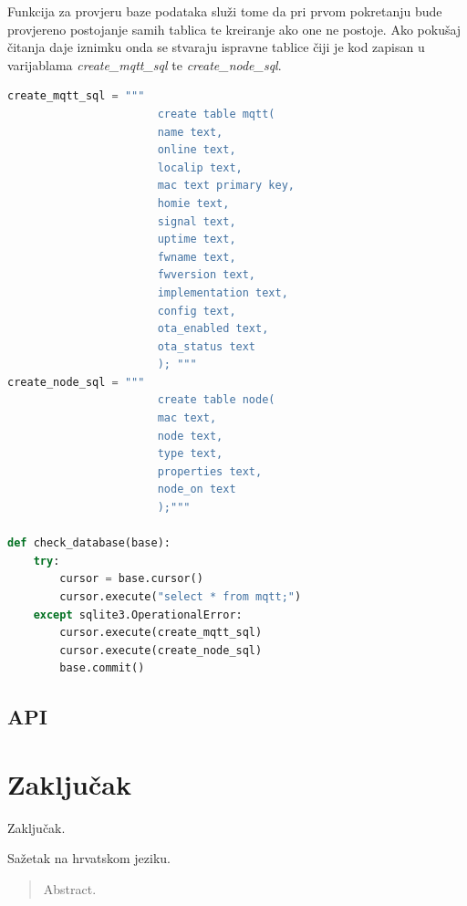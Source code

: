 \documentclass[times, utf8, zavrsni]{fer}
\begin{document}
Funkcija za provjeru baze podataka služi tome da pri prvom pokretanju bude provjereno postojanje samih tablica te kreiranje ako one ne postoje.
Ako pokušaj čitanja daje iznimku onda se stvaraju ispravne tablice čiji je kod zapisan u varijablama \textit{create_mqtt_sql} te \textit{create_node_sql}.
\begin{lstlisting}[language=Python, caption=Funkcija za provjeru baze podataka]
create_mqtt_sql = """
                       create table mqtt(
                       name text,
                       online text,
                       localip text,
                       mac text primary key,
                       homie text,
                       signal text,
                       uptime text,
                       fwname text,
                       fwversion text,
                       implementation text,
                       config text,
                       ota_enabled text,
                       ota_status text
                       ); """
create_node_sql = """
                       create table node(
                       mac text,
                       node text,
                       type text,
                       properties text,
                       node_on text
                       );"""

def check_database(base):
    try:
        cursor = base.cursor()
        cursor.execute("select * from mqtt;")
    except sqlite3.OperationalError:
        cursor.execute(create_mqtt_sql)
        cursor.execute(create_node_sql)
        base.commit()
\end{lstlisting}


\section{API}

\chapter{Zaključak}
Zaključak.




\begin{sazetak}
Sažetak na hrvatskom jeziku.

\end{sazetak}

\begin{abstract}
Abstract.

\end{abstract}
\end{document}
